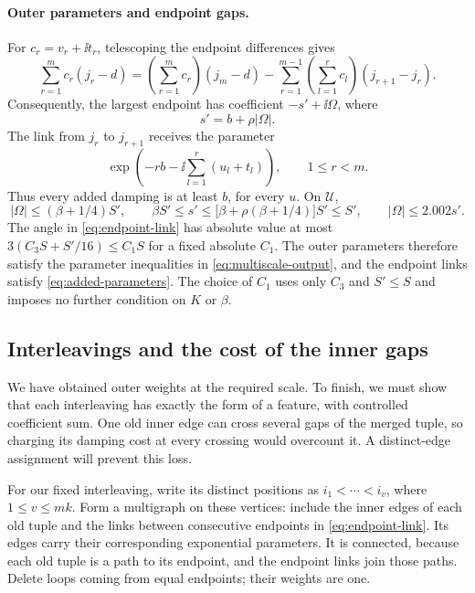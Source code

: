 \paragraph{Outer parameters and endpoint gaps.}
For $c_r=v_r+\ii t_r$, telescoping the endpoint differences gives
\begin{equation}
 \sum_{r=1}^m c_r(j_r-d)
 =\left(\sum_{r=1}^m c_r\right)(j_m-d)
  -\sum_{r=1}^{m-1}
    \left(\sum_{l=1}^r c_l\right)(j_{r+1}-j_r).
 \label{eq:endpoint-telescoping}
\end{equation}
Consequently, the largest endpoint has coefficient
$-s'+\ii\Omega$, where
\begin{equation}
 s'=b+\rho|\Omega|.
 \label{eq:new-outer-decay}
\end{equation}
The link from $j_r$ to $j_{r+1}$ receives the parameter
\begin{equation}
 \exp\left(-rb-\ii\sum_{l=1}^r(u_l+t_l)\right),
 \qquad 1\le r<m.
 \label{eq:endpoint-link}
\end{equation}
Thus every added damping is at least $b$, for every $u$.
On $\mathcal U$,
\[
 |\Omega|\le(\beta+1/4)S',\qquad
 \beta S'\le s'\le
   \bigl[\beta+\rho(\beta+1/4)\bigr]S'\le S',
 \qquad |\Omega|\le2.002s'.
\]
The angle in \eqref{eq:endpoint-link} has absolute value at most
$3(C_3S+S'/16)\le C_1S$ for a fixed absolute $C_1$.
The outer parameters therefore satisfy the parameter inequalities in
\eqref{eq:multiscale-output}, and the endpoint links satisfy
\eqref{eq:added-parameters}. The choice of $C_1$ uses only $C_3$ and
$S'\le S$ and imposes no further condition on $K$ or $\beta$.

\subsection{Interleavings and the cost of the inner gaps}
\label{subsec:interleavings}

We have obtained outer weights at the required scale. To finish, we must
show that each interleaving has exactly the form of a feature, with
controlled coefficient sum. One old inner edge can cross several gaps
of the merged tuple, so charging its damping cost at every crossing
would overcount it. A distinct-edge assignment will prevent this loss.

For our fixed interleaving, write its distinct positions as
$i_1<\cdots<i_v$, where $1\le v\le mk$. Form a multigraph on these
vertices: include the inner edges of each old tuple and the links
between consecutive endpoints in \eqref{eq:endpoint-link}. Its edges
carry their corresponding exponential parameters. It is connected,
because each old tuple is a path to its endpoint, and the endpoint
links join those paths. Delete loops coming from equal endpoints;
their weights are one.

